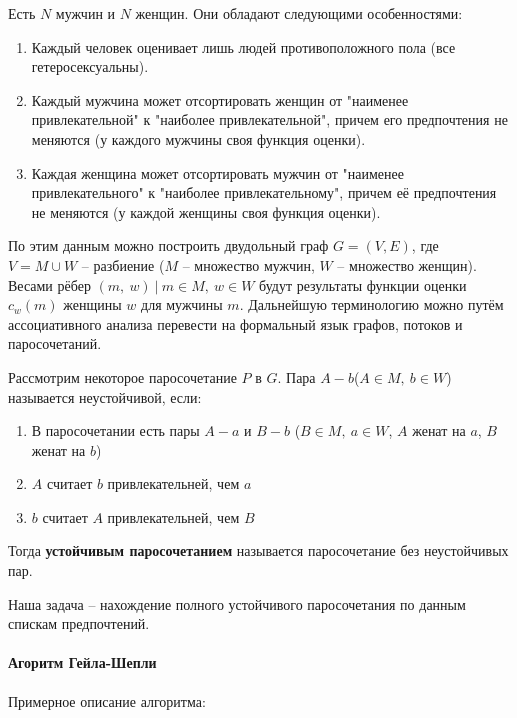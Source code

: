 \documentclass[a4paper,12pt]{article}
\begin{document}
Есть $N$ мужчин и $N$ женщин. Они обладают следующими особенностями:
\begin{enumerate}
    \item Каждый человек оценивает лишь людей противоположного пола (все гетеросексуальны).
    \item Каждый мужчина может отсортировать женщин от "наименее привлекательной" к "наиболее привлекательной", причем его предпочтения не меняются (у каждого мужчины своя функция оценки).
    \item Каждая женщина может отсортировать мужчин от "наименее привлекательного" к "наиболее привлекательному", причем её предпочтения не меняются (у каждой женщины своя функция оценки).
\end{enumerate}
По этим данным можно построить двудольный граф $G = (V, E)$, где $V = M \cup W$ -- разбиение ($M$ -- множество мужчин, $W$ -- множество женщин). Весами рёбер $(m,\ w)\ |\ m \in M,\ w \in W$ будут результаты функции оценки $c_w(m)$ женщины $w$ для мужчины $m$. Дальнейшую терминологию можно путём ассоциативного анализа перевести на формальный язык графов, потоков и паросочетаний.
\begin{definition}
    Рассмотрим некоторое паросочетание $P$ в $G$. Пара $A-b$($A \in M,\ b \in W$) называется неустойчивой, если:
    \begin{enumerate}
        \item В паросочетании есть пары $A-a$ и $B-b$ ($B \in M,\ a \in W$, $A$ женат на $a$, $B$ женат на $b$)
        \item $A$ считает $b$ привлекательней, чем $a$
        \item $b$ считает $A$ привлекательней, чем $B$
    \end{enumerate}
    Тогда \textbf{устойчивым паросочетанием} называется паросочетание без неустойчивых пар.
\end{definition}

Наша задача -- нахождение полного устойчивого паросочетания по данным спискам предпочтений.

\paragraph{Агоритм Гейла-Шепли}

Примерное описание алгоритма:
\end{document}
